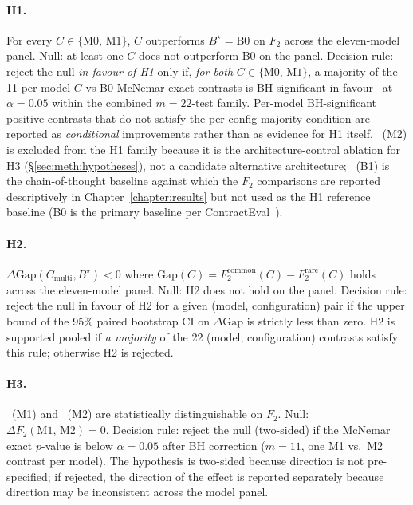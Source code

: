 \paragraph{H1.} For every $C \in \{\text{M0},\, \text{M1}\}$, $C$ outperforms
$B^\star = \text{B0}$ on $F_2$ across the eleven-model panel.
Null: at least one $C$ does not outperform B0 on the panel.
Decision rule: reject the null \emph{in favour of H1} only if, \emph{for both}
$C \in \{\text{M0},\,\text{M1}\}$, a majority of the 11 per-model
$C$-vs-B0 McNemar exact contrasts is BH-significant in
favour~\cite{benjamini1995controlling} at $\alpha{=}0.05$ within the combined
$m{=}22$-test family. Per-model BH-significant positive contrasts that do
not satisfy the per-config majority condition are reported as
\emph{conditional} improvements rather than as evidence for H1 itself.
\cfgCP\ (M2) is excluded from the H1 family because it is the architecture-control
ablation for H3 (\S\ref{sec:meth:hypotheses}), not a candidate alternative
architecture; \cfgCoT\ (B1) is the chain-of-thought baseline against which the
$F_2$ comparisons are reported descriptively in Chapter~\ref{chapter:results}
but not used as the H1 reference baseline (B0 is the primary baseline per
ContractEval~\cite{liu2025contracteval}).

\paragraph{H2.} $\Delta\mathrm{Gap}(C_{\text{multi}}, B^\star) < 0$ where
$\mathrm{Gap}(C) = F_2^{\text{common}}(C) - F_2^{\text{rare}}(C)$ holds across
the eleven-model panel.
Null: H2 does not hold on the panel.
Decision rule: reject the null in favour of H2 for a given (model,
configuration) pair if the upper bound of the 95\% paired bootstrap CI on
$\Delta\mathrm{Gap}$ is strictly less than zero. H2 is supported pooled if
\emph{a majority} of the 22 (model, configuration) contrasts satisfy this rule;
otherwise H2 is rejected.

\paragraph{H3.} \cfgMA\ (M1) and \cfgCP\ (M2) are statistically distinguishable on $F_2$.
Null: $\Delta F_2(\text{M1},\,\text{M2}) = 0$.
Decision rule: reject the null (two-sided) if the McNemar exact $p$-value is below
$\alpha{=}0.05$ after BH correction ($m{=}11$, one M1 vs.\ M2 contrast per model).
The hypothesis is two-sided because direction is not pre-specified; if rejected, the
direction of the effect is reported separately because direction may be inconsistent
across the model panel.


